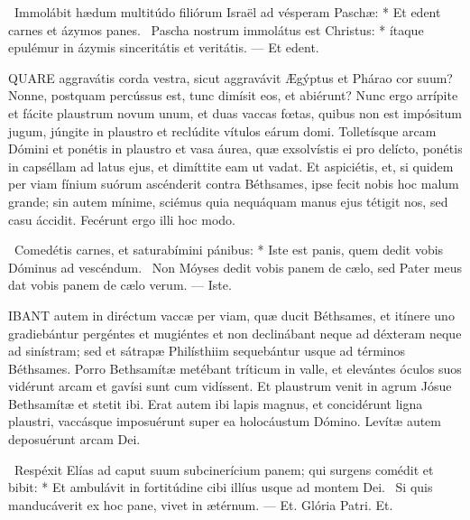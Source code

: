 \R\ Immolábit hædum multitúdo filiórum Israël ad vésperam Paschæ: * Et edent carnes et ázymos panes. \V\ Pascha nostrum immolátus est Christus: * ítaque epulémur in ázymis sinceritátis et veritátis. --- Et edent.


\lettrine[lines=2]{Q}{UARE} aggravátis corda vestra, sicut aggravávit Ægýptus et Phárao cor suum? Nonne, postquam percússus est, tunc dimísit eos, et abiérunt? Nunc ergo arrípite et fácite plaustrum novum unum, et duas vaccas fœtas, quibus non est impósitum jugum, júngite in plaustro et reclúdite vítulos eárum domi. Tolletísque arcam Dómini et ponétis in plaustro et vasa áurea, quæ exsolvístis ei pro delícto, ponétis in capséllam ad latus ejus, et dimíttite eam ut vadat. Et aspiciétis, et, si quidem per viam fínium suórum ascénderit contra Béthsames, ipse fecit nobis hoc malum grande; sin autem mínime, sciémus quia nequáquam manus ejus tétigit nos, sed casu áccidit. Fecérunt ergo illi hoc modo.

\R\ Comedétis carnes, et saturabímini pánibus: * Iste est panis, quem dedit vobis Dóminus ad vescéndum. \V\ Non Móyses dedit vobis panem de cælo, sed Pater meus dat vobis panem de cælo verum. --- Iste.


\lettrine[lines=2]{I}{BANT} autem in diréctum vaccæ per viam, quæ ducit Béthsames, et itínere uno gradiebántur pergéntes et mugiéntes et non declinábant neque ad déxteram neque ad sinístram; sed et sátrapæ Philísthiim sequebántur usque ad términos Béthsames. Porro Bethsamítæ metébant tríticum in valle, et elevántes óculos suos vidérunt arcam et gavísi sunt cum vidíssent. Et plaustrum venit in agrum Jósue Bethsamítæ et stetit ibi. Erat autem ibi lapis magnus, et concidérunt ligna plaustri, vaccásque imposuérunt super ea holocáustum Dómino. Levítæ autem deposuérunt arcam Dei.

\R\ Respéxit Elías ad caput suum subcinerícium panem; qui surgens comédit et bibit: * Et ambulávit in fortitúdine cibi illíus usque ad montem Dei. \V\ Si quis manducáverit ex hoc pane, vivet in ætérnum. --- Et. Glória Patri. Et.





